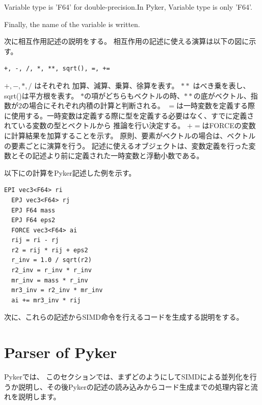 \documentclass[ams, a4j]{U-AizuGT}
\begin{document}
Variable type is 'F64' for double-precision.In Pyker, Variable type is only 'F64'.

Finally, the name of the variable is written.


次に相互作用記述の説明をする。
相互作用の記述に使える演算は以下の図に示す。
\begin{lstlisting}[frame=single]
 +, -, /, *, **, sqrt(), =, +=
\end{lstlisting}
$+, -, *, /$ はそれぞれ 加算、減算、乗算、徐算を表す。
$**$ はべき乗を表し、sqrt()は平方根を表す。
$*$の項がどちらもベクトルの時、$**$の底がベクトル、指数が2の場合にそれぞれ内積の計算と判断される。
$=$は一時変数を定義する際に使用する。一時変数は定義する際に型を定義する必要はなく、すでに定義されている変数の型とベクトルから
推論を行い決定する。
$+=$はFORCEの変数に計算結果を加算することを示す。
原則、要素がベクトルの場合は、ベクトルの要素ごとに演算を行う。
記述に使えるオブジェクトは、変数定義を行った変数とその記述より前に定義された一時変数と浮動小数である。

以下に\label{eq:gravity}の計算をPyker記述した例を示す。
\begin{lstlisting}[frame=single, caption=gravity\_interparticle, label=fuga]
  EPI vec3<F64> ri
  EPJ vec3<F64> rj
  EPJ F64 mass
  EPJ F64 eps2
  FORCE vec3<F64> ai
  rij = ri - rj
  r2 = rij * rij + eps2
  r_inv = 1.0 / sqrt(r2)
  r2_inv = r_inv * r_inv
  mr_inv = mass * r_inv
  mr3_inv = r2_inv * mr_inv
  ai += mr3_inv * rij
\end{lstlisting}

次に、これらの記述からSIMD命令を行えるコードを生成する説明をする。



\section{Parser of Pyker}
Pykerでは、
このセクションでは、まずどのようにしてSIMDによる並列化を行うか説明し、その後Pykerの記述の読み込みからコード生成までの処理内容と流れを説明します。




\end{document}
